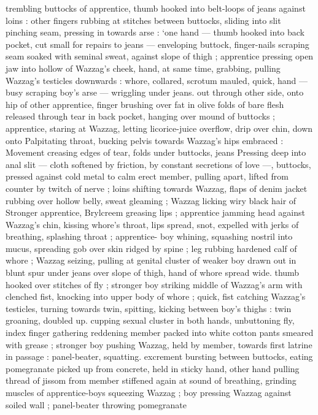 trembling buttocks of apprentice, thumb hooked into belt-loops of
jeans against loins : other fingers rubbing at stitches between
buttocks, sliding into slit pinching seam, pressing in towards arse :
‘one hand --- thumb hooked into back pocket, cut small for repairs to
jeans --- enveloping buttock, finger-nails scraping seam soaked with
seminal sweat, against slope of thigh ; apprentice pressing open jaw
into hollow of Wazzag's cheek, hand, at same time, grabbing, pulling
Wazzag's testicles downwards : whore, collared, scrotum mauled,
quick, hand --- busy scraping boy's arse --- wriggling under jeans.
out through other side, onto hip of other apprentice, finger brushing
over fat in olive folds of bare flesh released through tear in back
pocket, hanging over mound of buttocks ; apprentice, staring at
Wazzag, letting licorice-juice overflow, drip over chin, down onto
Palpitating throat, bucking pelvis towards Wazzag's hips embraced :
Movement creasing edges of tear, folds under buttocks, jeans
Pressing deep into anal slit --- cloth softened by friction, by constant
secretions of love ---, buttocks, pressed against cold metal to calm
erect member, pulling apart, lifted from counter by twitch of nerve ;
loins shifting towards Wazzag, flaps of denim jacket rubbing over
hollow belly, sweat gleaming ; Wazzag licking wiry black hair of
Stronger apprentice, Brylcreem greasing lips ; apprentice jamming
head against Wazzag's chin, kissing whore’s throat, lips spread,
snot, expelled with jerks of breathing, splashing throat ; apprentice-
boy whining, squashing nostril into mucus, spreading gob over skin
ridged by spine ; leg rubbing hardened calf of whore ; Wazzag
seizing, pulling at genital cluster of weaker boy drawn out in blunt
spur under jeans over slope of thigh, hand of whore spread wide.
thumb hooked over stitches of fly ; stronger boy striking middle of
Wazzag's arm with clenched fist, knocking into upper body of whore
; quick, fist catching Wazzag's testicles, turning towards twin,
spitting, kicking between boy's thighs : twin groaning, doubled up.
cupping sexual cluster in both hands, unbuttoning fly, index finger
gathering reddening member packed into white cotton pants
smeared with grease ; stronger boy pushing Wazzag, held by
member, towards first latrine in passage : panel-beater, squatting.
excrement bursting between buttocks, eating pomegranate picked up
from concrete, held in sticky hand, other hand pulling thread of
jissom from member stiffened again at sound of breathing, grinding
muscles of apprentice-boys squeezing Wazzag ; boy pressing
Wazzag against soiled wall ; panel-beater throwing pomegranate
